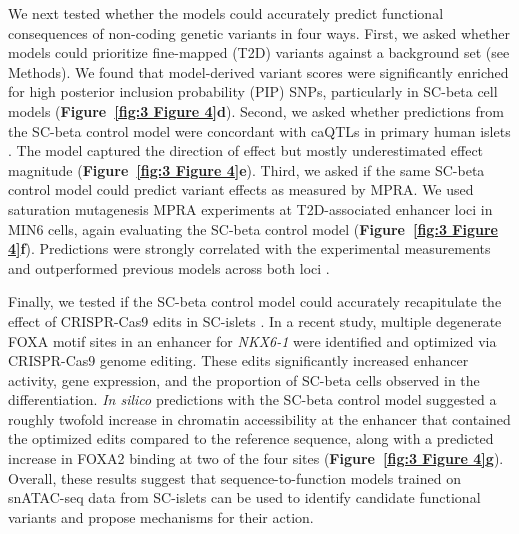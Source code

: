We next tested whether the models could accurately predict functional consequences of non-coding genetic variants in four ways. First, we asked whether models could prioritize fine-mapped (T2D) variants \cite{Mahajan2022-hu} against a background set (see Methods). We found that model-derived variant scores were significantly enriched for high posterior inclusion probability (PIP) SNPs, particularly in SC-beta cell models (\textbf{Figure~\ref{fig:3 Figure 4}\textbf{d}}). Second, we asked whether predictions from the SC-beta control model were concordant with caQTLs in primary human islets \cite{Mummey2024-kx}. The model captured the direction of effect but mostly underestimated effect magnitude (\textbf{Figure~\ref{fig:3 Figure 4}\textbf{e}}). Third, we asked if the same SC-beta control model could predict variant effects as measured by MPRA. We used saturation mutagenesis MPRA experiments at T2D-associated enhancer loci in MIN6 cells, again evaluating the SC-beta control model \cite{Kircher2019-di} (\textbf{Figure~\ref{fig:3 Figure 4}\textbf{f}}). Predictions were strongly correlated with the experimental measurements and outperformed previous models across both loci \cite{Hudaiberdiev2023-ew}.

Finally, we tested if the SC-beta control model could accurately recapitulate the effect of CRISPR-Cas9 edits in SC-islets \cite{Geusz2021-mr}. In a recent study, multiple degenerate FOXA motif sites in an enhancer for \textit{NKX6-1} were identified and optimized via CRISPR-Cas9 genome editing. These edits significantly increased enhancer activity, gene expression, and the proportion of SC-beta cells observed in the differentiation. \textit{In silico} predictions with the SC-beta control model suggested a roughly twofold increase in chromatin accessibility at the enhancer that contained the optimized edits compared to the reference sequence, along with a predicted increase in FOXA2 binding at two of the four sites (\textbf{Figure~\ref{fig:3 Figure 4}\textbf{g}}). Overall, these results suggest that sequence-to-function models trained on snATAC-seq data from SC-islets can be used to identify candidate functional variants and propose mechanisms for their action.

\clearpage

